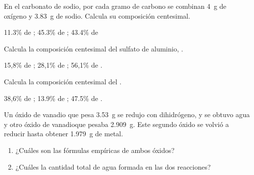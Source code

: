 \begin{exercise}[
    tags    = {termodinámica, entalpía, entalpia de reacción, calor},
    topics  = {química, termoquímica, termodinámica},
    source  = {FQ 1B SAN 2015, p43, e44},
  ]
  En el carbonato de sodio, por cada gramo de carbono se combinan \SI{4}{\gram} de oxígeno y \SI{3.83}{\gram} de sodio. Calcula su composición centesimal.
\end{exercise}

\begin{solution}
  11.3\% de ; 45.3\% de ; 43.4\% de 
\end{solution}




\begin{exercise}[
    tags    = {termodinámica, entalpía, entalpia de reacción, calor},
    topics  = {química, termoquímica, termodinámica},
    source  = {FQ 1B OXF 2015, p43, e42},
  ]
  Calcula la composición centesimal del sulfato de aluminio, .
\end{exercise}

\begin{solution}
  15,8\% de ; 28,1\% de ; 56,1\% de .
\end{solution}



\begin{exercise}[
    tags    = {termodinámica, entalpía, entalpia de reacción, calor},
    topics  = {química, termoquímica, termodinámica},
    source  = {FQ 1B OXF 2015, p43, e43},
  ]
  Calcula la composición centesimal del .
\end{exercise}

\begin{solution}
  38,6\% de ; 13.9\% de ; 47.5\% de .
\end{solution}




\begin{exercise}[
    tags    = {termodinámica, entalpía, entalpia de reacción, calor},
    topics  = {química, termoquímica, termodinámica},
    source  = {FQ 1B OXF 2015, p43, e45},
  ]
  Un óxido de vanadio que pesa \SI{3,53}{\gram} se redujo con dihidrógeno, y se obtuvo agua y otro óxido de vanadioque pesaba \SI{2,909}{\gram}. Este segundo óxido se volvió a reducir hasta obtener \SI{1,979}{\gram} de metal.
  \begin{enumerate}
    \item ¿Cuáles son las fórmulas empíricas de ambos óxidos?
    \item ¿Cuáles la cantidad total de agua formada en las dos reacciones?
  \end{enumerate}
\end{exercise}

